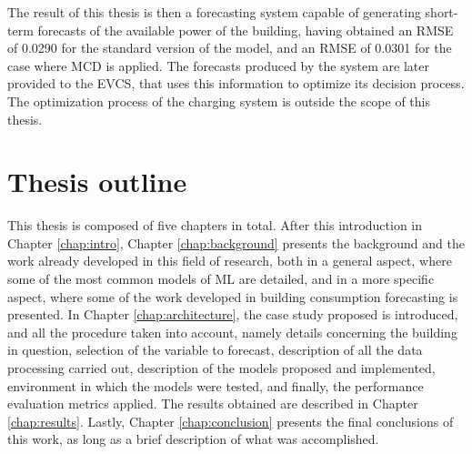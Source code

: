 The result of this thesis is then a forecasting system capable of generating short-term forecasts of the available power of the building, having obtained an \ac{RMSE} of 0.0290 for the standard version of the model, and an \ac{RMSE} of 0.0301 for the case where {MCD} is applied. The forecasts produced by the system are later provided to the \ac{EVCS}, that uses this information to optimize its decision process. The optimization process of the charging system is outside the scope of this thesis.

\section{Thesis outline}

This thesis is composed of five chapters in total. After this introduction in Chapter \ref{chap:intro}, Chapter \ref{chap:background} presents the background and the work already developed in this field of research, both in a general aspect, where some of the most common models of ML are detailed, and in a more specific aspect, where some of the work developed in building consumption forecasting is presented. In Chapter \ref{chap:architecture}, the case study proposed is introduced, and all the procedure taken into account, namely details concerning the building in question, selection of the variable to forecast, description of all the data processing carried out, description of the models proposed and implemented, environment in which the models were tested, and finally, the performance evaluation metrics applied. The results obtained are described in Chapter \ref{chap:results}. Lastly, Chapter \ref{chap:conclusion} presents the final conclusions of this work, as long as a brief description of what was accomplished.
